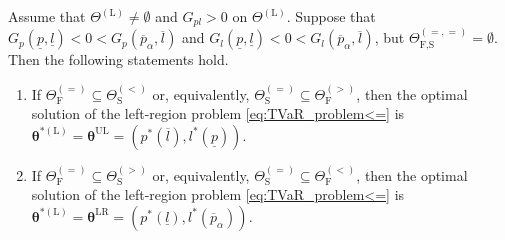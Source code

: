 \documentclass[10pt,a4paper]{amsart}
\begin{document}
\begin{proposition}\label{prop:tvar_second_result}
Assume that $\Theta^{\left(\text{L}\right)}\neq\emptyset$ and $G_{pl}>0$ on $\Theta^{\left(\text{L}\right)}$. Suppose that $G_p\left(\underline{p},\underline{l}\right)<0<G_p\left(\overline{p}_{\alpha},\overline{l}\right)$ and $G_l\left(\underline{p},\underline{l}\right)<0<G_l\left(\overline{p}_{\alpha},\overline{l}\right)$, but $\Theta_{\text{F,S}}^{\left(=,=\right)}=\emptyset$. Then the following statements hold.

\begin{enumerate}
\item[(i)] If $\Theta_{\text{F}}^{\left(=\right)}\subseteq\Theta_{\text{S}}^{\left(<\right)}$ or, equivalently, $\Theta_{\text{S}}^{\left(=\right)}\subseteq\Theta_{\text{F}}^{\left(>\right)}$, then the optimal solution of the left-region problem \eqref{eq:TVaR_problem<=} is ${\bm\theta}^{*\left(\text{L}\right)}={\bm\theta}^{\text{UL}}=\left(p^*\left(\overline{l}\right),l^*\left(\underline{p}\right)\right)$.
\item[(ii)] If $\Theta_{\text{F}}^{\left(=\right)}\subseteq\Theta_{\text{S}}^{\left(>\right)}$ or, equivalently, $\Theta_{\text{S}}^{\left(=\right)}\subseteq\Theta_{\text{F}}^{\left(<\right)}$, then the optimal solution of the left-region problem \eqref{eq:TVaR_problem<=} is ${\bm\theta}^{*\left(\text{L}\right)}={\bm\theta}^{\text{LR}}=\left(p^*\left(\underline{l}\right),l^*\left(\overline{p}_{\alpha}\right)\right)$.
\end{enumerate}
\end{proposition}
\end{document}

